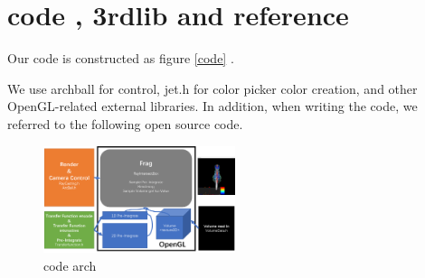 \documentclass[sigconf]{acmart}
\begin{document}
\section{code , 3rdlib and reference}

Our code is constructed as figure \ref{code} . 


We use archball\cite{TuvokBas3:online} for control, jet.h for color picker color creation, and other OpenGL-related external libraries. In addition, when writing the code, we referred to the following open source code.\cite{nnagurur86:online}\cite{toolchai50:online}
\begin{figure}
    \centering
    \includegraphics[width=0.5\textwidth]{imgs/code.png}
    \caption{code arch}
    \label{fig:code}
\end{figure}

% 




% 
\end{document}
